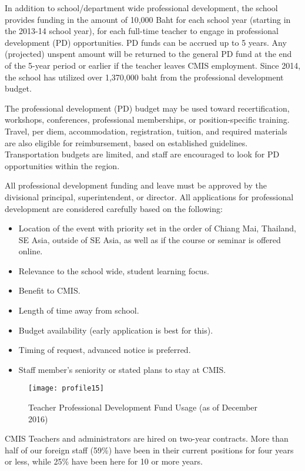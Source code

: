 
In addition to school/department wide professional development, the school provides funding in the amount of 10,000 Baht for each school year (starting in the 2013-14 school year), for each full-time teacher to engage in professional development (PD) opportunities.  PD funds can be accrued up to 5 years. Any (projected) unspent amount will be returned to the general PD fund at the end of the 5-year period or earlier if the teacher leaves CMIS employment. Since 2014, the school has utilized over 1,370,000 baht from the professional development budget.

The professional development (PD) budget may be used toward recertification, workshops, conferences, professional memberships, or position-specific training.  Travel, per diem, accommodation, registration, tuition, and required materials are also eligible for reimbursement, based on established guidelines.  Transportation budgets are limited, and staff are encouraged to look for PD opportunities within the region.  

All professional development funding and leave must be approved by the divisional principal, superintendent, or director.  All applications for professional development are considered carefully based on the following:

\begin{itemize}
\item Location of the event with priority set in the order of Chiang Mai, Thailand, SE Asia, outside of SE Asia, as well as if the course or seminar is offered online.
\item Relevance to the school wide, student learning focus.
\item Benefit to CMIS.
\item Length of time away from school.
\item Budget availability (early application is best for this).
\item Timing of request, advanced notice is preferred.
\item Staff member’s seniority or stated plans to stay at CMIS.
\end{itemize}

\begin{figure}
\centering
\texttt{[image: profile15]}
\caption{Teacher Professional Development Fund Usage (as of December 2016)}
\end{figure}

CMIS Teachers and administrators are hired on two-year contracts.  More than half of our foreign staff (59\%) have been in their current positions for four years or less, while 25\% have been here for 10 or more years. 

